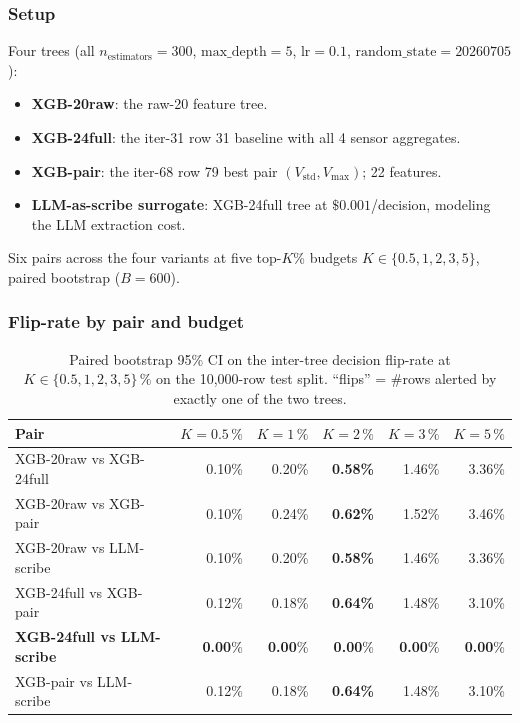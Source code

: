 \documentclass{article}
\begin{document}
\subsubsection{Setup}

Four trees (all $n_\text{estimators}{=}300$, $\text{max\_depth}{=}5$,
$\text{lr}{=}0.1$, $\text{random\_state}{=}20260705$):
\begin{itemize}
    \item \textbf{XGB-20raw}: the raw-20 feature tree.
    \item \textbf{XGB-24full}: the iter-31 row 31 baseline with all 4
          sensor aggregates.
    \item \textbf{XGB-pair}: the iter-68 row 79 best pair
          $(V_\text{std}, V_\text{max})$; 22 features.
    \item \textbf{LLM-as-scribe surrogate}: XGB-24full tree at
          $\$0.001$/decision, modeling the LLM extraction cost.
\end{itemize}
Six pairs across the four variants at five top-$K$\% budgets
$K \in \{0.5, 1, 2, 3, 5\}$, paired bootstrap ($B{=}600$).

\subsubsection{Flip-rate by pair and budget}\label{sec:p8-decision-disagreement-flip}

\begin{table}[t]
\centering\small
\caption{Paired bootstrap 95\% CI on the inter-tree decision flip-rate at
$K \in \{0.5, 1, 2, 3, 5\}\,\%$ on the 10,000-row test split.
``flips'' = \#rows alerted by exactly one of the two trees.}
\label{tab:p8-decision-disagreement-flip}
\begin{tabular}{lrrrrr}
\toprule
Pair & $K{=}0.5\,\%$ & $K{=}1\,\%$ & $K{=}2\,\%$ & $K{=}3\,\%$ & $K{=}5\,\%$ \\
\midrule
XGB-20raw vs XGB-24full    & 0.10\% & 0.20\% & \textbf{0.58\%} & 1.46\% & 3.36\% \\
XGB-20raw vs XGB-pair      & 0.10\% & 0.24\% & \textbf{0.62\%} & 1.52\% & 3.46\% \\
XGB-20raw vs LLM-scribe    & 0.10\% & 0.20\% & \textbf{0.58\%} & 1.46\% & 3.36\% \\
XGB-24full vs XGB-pair     & 0.12\% & 0.18\% & \textbf{0.64\%} & 1.48\% & 3.10\% \\
\textbf{XGB-24full vs LLM-scribe}   & \textbf{0.00}\% & \textbf{0.00}\% & \textbf{0.00}\% & \textbf{0.00}\% & \textbf{0.00}\% \\
XGB-pair vs LLM-scribe     & 0.12\% & 0.18\% & \textbf{0.64\%} & 1.48\% & 3.10\% \\
\bottomrule
\end{tabular}
\end{table}
\end{document}
